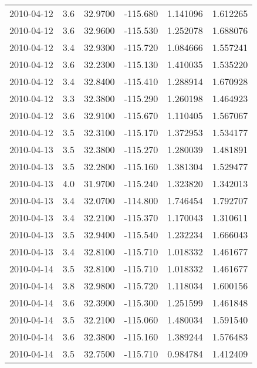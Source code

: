 \begin{tabular}{lrrrrr}
2010-04-12 &       3.6 &  32.9700 &  -115.680 &         1.141096 &         1.612265 \\
2010-04-12 &       3.6 &  32.9600 &  -115.530 &         1.252078 &         1.688076 \\
2010-04-12 &       3.4 &  32.9300 &  -115.720 &         1.084666 &         1.557241 \\
2010-04-12 &       3.6 &  32.2300 &  -115.130 &         1.410035 &         1.535220 \\
2010-04-12 &       3.4 &  32.8400 &  -115.410 &         1.288914 &         1.670928 \\
2010-04-12 &       3.3 &  32.3800 &  -115.290 &         1.260198 &         1.464923 \\
2010-04-12 &       3.6 &  32.9100 &  -115.670 &         1.110405 &         1.567067 \\
2010-04-12 &       3.5 &  32.3100 &  -115.170 &         1.372953 &         1.534177 \\
2010-04-13 &       3.5 &  32.3800 &  -115.270 &         1.280039 &         1.481891 \\
2010-04-13 &       3.5 &  32.2800 &  -115.160 &         1.381304 &         1.529477 \\
2010-04-13 &       4.0 &  31.9700 &  -115.240 &         1.323820 &         1.342013 \\
2010-04-13 &       3.4 &  32.0700 &  -114.800 &         1.746454 &         1.792707 \\
2010-04-13 &       3.4 &  32.2100 &  -115.370 &         1.170043 &         1.310611 \\
2010-04-13 &       3.5 &  32.9400 &  -115.540 &         1.232234 &         1.666043 \\
2010-04-13 &       3.4 &  32.8100 &  -115.710 &         1.018332 &         1.461677 \\
2010-04-14 &       3.5 &  32.8100 &  -115.710 &         1.018332 &         1.461677 \\
2010-04-14 &       3.8 &  32.9800 &  -115.720 &         1.118034 &         1.600156 \\
2010-04-14 &       3.6 &  32.3900 &  -115.300 &         1.251599 &         1.461848 \\
2010-04-14 &       3.5 &  32.2100 &  -115.060 &         1.480034 &         1.591540 \\
2010-04-14 &       3.6 &  32.3800 &  -115.160 &         1.389244 &         1.576483 \\
2010-04-14 &       3.5 &  32.7500 &  -115.710 &         0.984784 &         1.412409 \\

\end{tabular}
